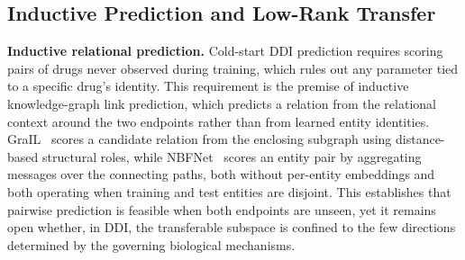 \documentclass[letterpaper]{article} %
\begin{document}
\subsection{Inductive Prediction and Low-Rank Transfer}

\textbf{Inductive relational prediction.} 
Cold-start DDI prediction requires scoring pairs of drugs never observed during training, which rules out any parameter tied to a specific drug's identity.
%
This requirement is the premise of inductive knowledge-graph link prediction, which predicts a relation from the relational context around the two endpoints rather than from learned entity identities.
%
GraIL~\cite{GRAIL-PMLR-2020} scores a candidate relation from the enclosing subgraph using distance-based structural roles, while NBFNet~\cite{NBF-NIPS-2021} scores an entity pair by aggregating messages over the connecting paths, both without per-entity embeddings and both operating when training and test entities are disjoint. 
%
This establishes that pairwise prediction is feasible when both endpoints are unseen, yet it remains open whether, in DDI, the transferable subspace is confined to the few directions determined by the governing biological mechanisms.
\end{document}
